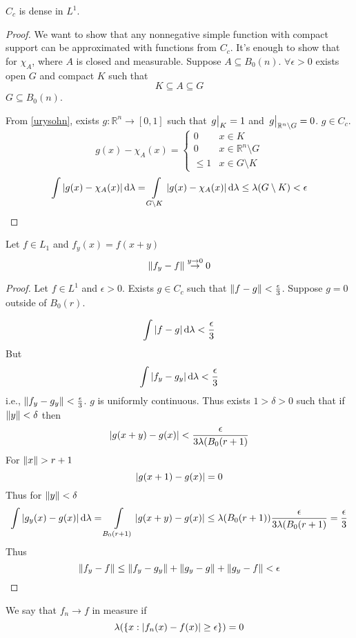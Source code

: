 \begin{lemma}
	$C_c$ is dense in $L^1$.
	\begin{proof}
		We want to show that any nonnegative simple function with compact support can be approximated with functions from $C_c$. It's enough to show that for $\chi_A$, where $A$ is closed and measurable. Suppose $A\subseteq B_0(n)$. $\forall \epsilon >0$ exists open $G$ and compact $K$ such that 
		$$K\subseteq A \subseteq G$$
		$G\subseteq B_0(n)$.
		
		From \ref{urysohn}, exists $g: \mathbb{R}^n \to [0,1]$ such that 
		$\eval{g}_{K} = 1$ and $\eval{g}_{\mathbb{R}^n \setminus G}=0$. $g\in C_c$.
		$$g(x) - \chi_A(x) = \begin{cases}
		0&x\in K\\
		0& x \in \mathbb{R}^n \setminus G\\
		\leq 1 & x\in G\setminus K
		\end{cases}$$
		$$\int \abs{g(x) - \chi_A(x)} \dd{\lambda} = \int\limits_{G\setminus K} \abs{g(x) - \chi_A(x)} \dd{\lambda} \leq \lambda(G\setminus K) < \epsilon$$
	\end{proof} 
\end{lemma}

\begin{theorem}
	Let $f\in L_1$ and $f_y(x) = f(x+y)$
	$$\norm{f_y-f} \stackrel{y\to0}{\to} 0$$
	\begin{proof}
		Let $f\in L^1$ and $\epsilon>0$. Exists $g\in C_c$ such that $\norm{f-g} <\frac{\epsilon}{3}$. Suppose $g=0$ outside of $B_0(r)$.
		
		$$\int \abs{f-g} \dd{\lambda} < \frac{\epsilon}{3} $$
		But
		$$\int \abs{f_y-g_y} \dd{\lambda} < \frac{\epsilon}{3} $$
		i.e., $\norm{f_y-g_y} <\frac{\epsilon}{3}$.
		$g$ is uniformly continuous. Thus exists $1>\delta>0$ such that if $\norm{y}<\delta$ then
		$$\abs{g(x+y)-g(x)} <\frac{\epsilon}{3\lambda(B_0(r+1)}$$
		For $\norm{x} > r+1$ 
		$$\abs{g(x+1)-g(x) } = 0$$
		Thus for $\norm{y}<\delta$
		$$\int \abs{g_y(x) -g(x)} \dd{\lambda} = \int\limits_{B_0(r+1)} \abs{g(x+y)-g(x)} \leq \lambda(B_0(r+1)) \frac{\epsilon}{3\lambda(B_0(r+1)} = \frac{\epsilon}{3}$$
		Thus
		$$\norm{f_y-f} \leq \norm{f_y-g_y} + \norm{g_y-g} + \norm{g_y-f} <\epsilon$$		
	\end{proof}
\end{theorem}

\begin{definition}
	We say that $f_n\to f$ in measure if 
	$$\lambda\qty(\left\{ x: \abs{f_n(x) - f(x)} \geq \epsilon  \right\}) = 0$$
\end{definition}

